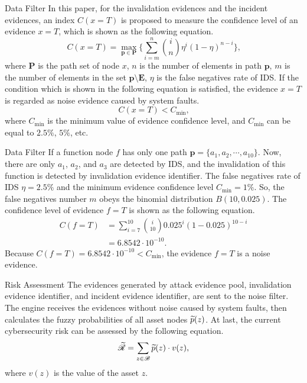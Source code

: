 \begin{frame}{Data Filter}
    In this paper, for the invalidation evidences and the incident evidences, an index $C(x = T)$ is proposed to measure the confidence level of an evidence $x = T$, which is shown as the following equation.
    \[
      C(x = T) = \max_{\bm{p}\in\bm{P}}\Big\{
        \sum_{i=m}^n \binom{i}{n} \eta^i(1-\eta)^{n-i}
      \Big\}\text{,}
    \]\pause
    where $\bm{P}$ is the path set of node $x$, $n$ is the number of elements in path $\bm{p}$, $m$ is the number of elements in the set $\bm{p}\setminus\bm{E}$, $\eta$ is the false negatives rate of IDS. \pause If the condition which is shown in the following equation is satisfied, the evidence $x = T$ is regarded as noise evidence caused by system faults.
    \[
        C(x = T) < C_{\min}\text{,}
    \]\pause
    where $C_{\min}$ is the minimum value of evidence confidence level, and $C_{\min}$ can be equal to $2.5\%$, $5\%$, etc.
\end{frame}

\begin{frame}{Data Filter}
    If a function node $f$ has only one path $\bm{p} = \{a_1, a_2, \cdots, a_{10}\}$. Now, there are only $a_1$, $a_2$, and $a_3$ are detected by IDS, and the invalidation of this function is detected by invalidation evidence identifier. The false negatives rate of IDS $\eta = 2.5\%$ and the minimum evidence confidence level $C_{\min} = 1\%$. \pause So, the false negatives number $m$ obeys the binomial distribution $B(10,0.025)$. \pause The confidence level of evidence $f = T$ is shown as the following equation.
    \begin{align*}
        C(f = T) &= \sum_{i=7}^{10} \binom{i}{10} 0.025^i(1-0.025)^{10-i}\\
                 & = 6.8542 \cdot 10^{-10}\text{.}
    \end{align*}\pause
    Because $C(f = T) = 6.8542 \cdot 10^{-10} < C_{\min}$, the evidence $f = T$ is a noise evidence.
\end{frame}

\begin{frame}{Risk Assessment}
    The evidences generated by attack evidence pool, invalidation evidence identifier, and incident evidence identifier, are sent to the noise filter. \pause The \abfbai{} engine receives the evidences without noise caused by system faults, then calculates the fuzzy probabilities of all asset nodes $\widetilde{p}{}(z)$. \pause At last, the current cybersecurity risk can be assessed by the following equation.
    \[
    \widetilde{\mathscr{R}}{}=\sum_{z\in\mathscr{B}}{\widetilde{p}{}{(z)}\cdot v(z)}\text{,}
    \]\pause
    where $v(z)$ is the value of the asset $z$.
\end{frame}
